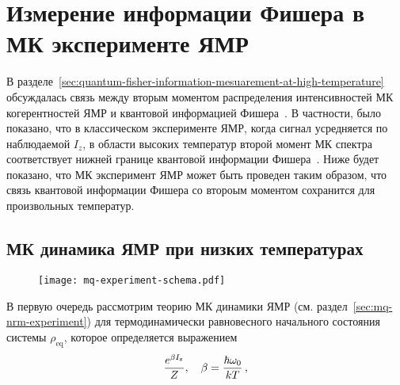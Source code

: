 \chapter{Измерение информации Фишера в МК эксперименте ЯМР}
\label{chapter:quantum-fisher-information-measurement}

В разделе~\ref{sec:quantum-fisher-information-mesuarement-at-high-temperature}
обсуждалась связь между вторым моментом распределения интенсивностей МК когерентностей ЯМР и квантовой информацией Фишера~\cite{Toth2014,Pezze2018}.
В частности, было показано,
что в классическом эксперименте ЯМР, когда сигнал усредняется по наблюдаемой $I_z$, в области высоких температур второй момент МК спектра соответствует нижней границе квантовой информации Фишера~\cite{Garttner2018}.
Ниже будет показано, что МК эксперимент ЯМР может быть проведен таким образом,
что связь квантовой информации Фишера со второым моментом сохранится для произвольных температур.


\section{МК динамика ЯМР при низких температурах}
\begin{figure}[H]
  \centering
  \texttt{[image: mq-experiment-schema.pdf]}
  \caption{\protect}
  \label{fig:mq-experiment-schema}
\end{figure}

В первую очередь рассмотрим теорию МК динамики ЯМР (см. раздел~\ref{sec:mq-nrm-experiment})
для термодинамически равновесного начального состояния системы $\rho_\mathrm{eq}$,
которое определяется выражением
%
\begin{equation}\label{eq:rho_eq}
  \dfrac{e^{\beta I_\mathrm{z}}}{Z}, \quad \beta = \frac{\hbar\omega_{0}}{kT} \, ,
\end{equation}
%
\rhoEqExplanatoryNote

